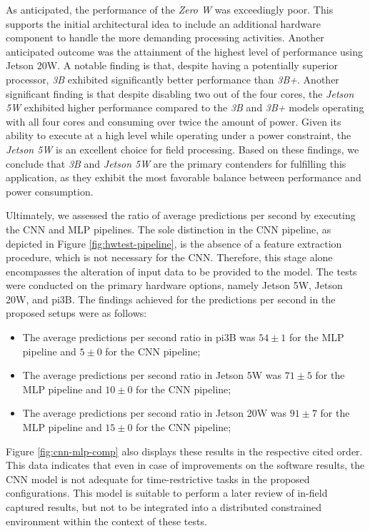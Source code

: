 As anticipated, the performance of the \textit{Zero W} was exceedingly poor. This supports the initial architectural idea to include an additional hardware component to handle the more demanding processing activities. Another anticipated outcome was the attainment of the highest level of performance using Jetson 20W. A notable finding is that, despite having a potentially superior processor, \textit{3B} exhibited significantly better performance than \textit{3B+}. Another significant finding is that despite disabling two out of the four cores, the \textit{Jetson 5W} exhibited higher performance compared to the \textit{3B} and \textit{3B+} models operating with all four cores and consuming over twice the amount of power. Given its ability to execute at a high level while operating under a power constraint, the \textit{Jetson 5W} is an excellent choice for field processing. Based on these findings, we conclude that \textit{3B} and \textit{Jetson 5W} are the primary contenders for fulfilling this application, as they exhibit the most favorable balance between performance and power consumption.

Ultimately, we assessed the ratio of average predictions per second by executing the CNN and MLP pipelines. The sole distinction in the CNN pipeline, as depicted in Figure \ref{fig:hwtest-pipeline}, is the absence of a feature extraction procedure, which is not necessary for the CNN. Therefore, this stage alone encompasses the alteration of input data to be provided to the model. The tests were conducted on the primary hardware options, namely Jetson 5W, Jetson 20W, and pi3B. The findings achieved for the predictions per second in the proposed setups were as follows:

\begin{itemize}
    \item The average predictions per second ratio in pi3B was $54 \pm 1$ for the MLP pipeline and $5 \pm 0$ for the CNN pipeline; \item The average predictions per second ratio in Jetson 5W was $71 \pm 5$ for the MLP pipeline and $10 \pm 0$ for the CNN pipeline;
    \item The average predictions per second ratio in Jetson 20W was $91 \pm 7$ for the MLP pipeline and $15 \pm 0$ for the CNN pipeline;
\end{itemize}

Figure \ref{fig:cnn-mlp-comp} also displays these results in the respective cited order. This data indicates that even in case of improvements on the software results, the CNN model is not adequate for time-restrictive tasks in the proposed configurations. This model is suitable to perform a later review of in-field captured results, but not to be integrated into a distributed constrained environment within the context of these tests.

